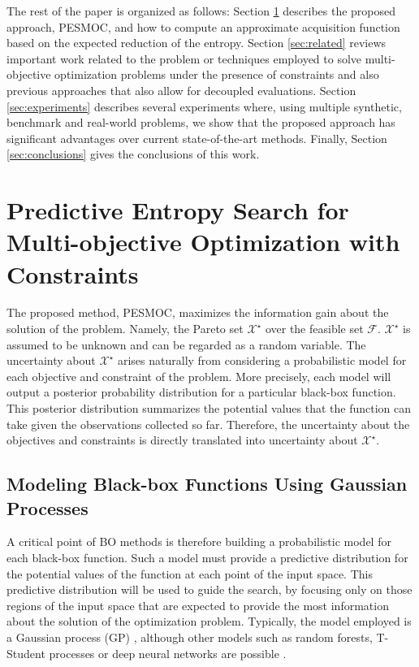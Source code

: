 \documentclass[review,preprint,12pt]{elsarticle}
\begin{document}
The rest of the paper is organized as follows: Section \ref{sec:pesmoc} 
describes the proposed approach, PESMOC, and how to compute an approximate acquisition 
function based on the expected reduction of the entropy. Section \ref{sec:related} reviews important work 
related to the problem or techniques employed to solve multi-objective optimization 
problems under the presence of constraints and also previous approaches that also allow 
for decoupled evaluations. Section \ref{sec:experiments} describes several experiments 
where, using multiple synthetic, benchmark and real-world problems, we show that the proposed 
approach has significant advantages over current state-of-the-art methods. Finally, Section 
\ref{sec:conclusions} gives the conclusions of this work.

\section{Predictive Entropy Search for Multi-objective Optimization with Constraints}
\label{sec:pesmoc}

The proposed method, PESMOC, maximizes the information gain about the solution of the problem.
Namely, the Pareto set $\mathcal{X}^\star$ over the feasible set $\mathcal{F}$. 
$\mathcal{X}^\star$ is assumed to be unknown and can be regarded as a random 
variable. The uncertainty about $\mathcal{X}^\star$ arises naturally from considering a probabilistic 
model for each objective and constraint of the problem. More precisely, each model will output a posterior 
probability distribution for a particular black-box function. This posterior distribution summarizes the potential 
values that the function can take given the observations collected so far. Therefore, the 
uncertainty about the objectives and constraints is directly translated into uncertainty about $\mathcal{X}^\star$.

\subsection{Modeling Black-box Functions Using Gaussian Processes}

A critical point of BO methods is therefore building a probabilistic model for each black-box 
function. Such a model must provide a predictive distribution for the potential values of the 
function at each point of the input space. This predictive distribution will be used to guide the 
search, by focusing only on those regions of the input space that are expected to provide the most 
information about the solution of the optimization problem. Typically, the model employed is a Gaussian
process (GP) \citep{rasmussen2006gaussian}, although other models such as random forests, 
T-Student processes or deep neural networks  are possible \citep{hutter2011sequential,shah2014student,snoek2015scalable}.
\end{document}
